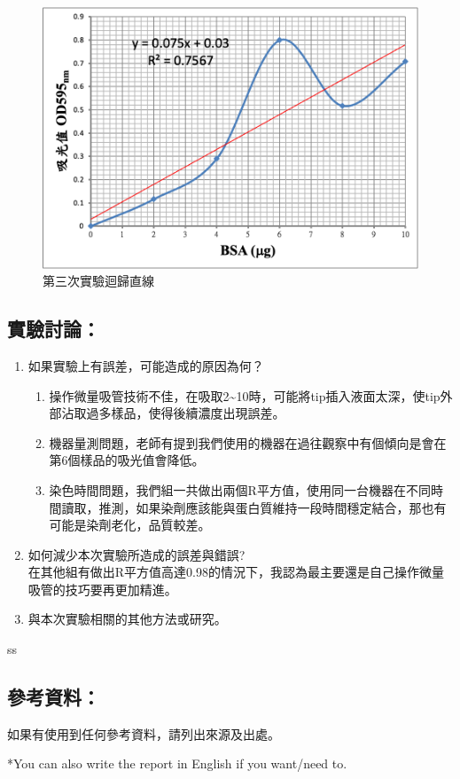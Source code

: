 \begin{figure}[H]
\begin{minipage}[b]{0.4\textwidth} %
\centering
\includegraphics[width=.9\textwidth]{paste_src/2023-09-28-13-16-57.png}
\caption{第三次實驗迴歸直線}
\label{}
\end{minipage}
\end{figure}

\subsection*{實驗討論：}

\begin{enumerate}[label=\arabic*.]
  \item 如果實驗上有誤差，可能造成的原因為何？
  \begin{enumerate}[label=(\arabic*)]
    \item 操作微量吸管技術不佳，在吸取2\~{}10\mul 時，可能將tip插入液面太深，使tip外部沾取過多樣品，使得後續濃度出現誤差。
    \item 機器量測問題，老師有提到我們使用的機器在過往觀察中有個傾向是會在第6個樣品的吸光值會降低。
    \item 染色時間問題，我們組一共做出兩個R平方值，使用同一台機器在不同時間讀取，推測，如果染劑應該能與蛋白質維持一段時間穩定結合，那也有可能是染劑老化，品質較差。
  \end{enumerate}

  \item 如何減少本次實驗所造成的誤差與錯誤?\\
  在其他組有做出R平方值高達0.98的情況下，我認為最主要還是自己操作微量吸管的技巧要再更加精進。
  \item 與本次實驗相關的其他方法或研究。

\end{enumerate}


ss


\subsection*{參考資料：}
如果有使用到任何參考資料，請列出來源及出處。

*You can also write the report in English if you want/need to.
